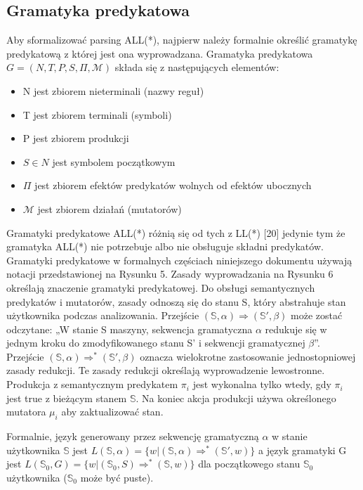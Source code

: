 \subsection{Gramatyka predykatowa}
Aby sformalizować parsing ALL(*), najpierw należy formalnie
określić gramatykę predykatową z której jest ona wyprowadzana.
Gramatyka predykatowa \(G = (N, T, P, S, \Pi, \mathcal{M})\) składa się z następujących elementów: 
\begin{itemize}
\item N jest zbiorem nieterminali (nazwy reguł)
\item T jest zbiorem terminali (symboli) 
\item P jest zbiorem produkcji 
\item \(S \in N\) jest symbolem początkowym 
\item \( \Pi \) jest zbiorem efektów predykatów wolnych od efektów ubocznych
\item \(\mathcal{M}\) jest zbiorem działań (mutatorów) 
\end{itemize}
Gramatyki predykatowe ALL(*) różnią się od tych z LL(*) [20] jedynie tym że
gramatyka ALL(*) nie potrzebuje albo nie obsługuje składni predykatów.
Gramatyki predykatowe w formalnych częściach niniejszego dokumentu używają
notacji przedstawionej na Rysunku 5.
Zasady wyprowadzania na Rysunku 6 określają znaczenie gramatyki predykatowej.
Do obsługi semantycznych predykatów i mutatorów, zasady odnoszą się do stanu S,
który abstrahuje stan użytkownika podczas analizowania.
Przejście \(( \mathbb{S}, \alpha) \Rightarrow ( \mathbb{S'}, \beta) \)
może zostać odczytane: „W stanie S maszyny, sekwencja gramatyczna \(\alpha\)
redukuje się w jednym kroku do zmodyfikowanego stanu S' i sekwencji gramatycznej \(\beta\)”.
Przejście \((\mathbb{S}, \alpha) \Rightarrow^* (\mathbb{S'}, \beta)\)
oznacza wielokrotne zastosowanie jednostopniowej zasady redukcji.
Te zasady redukcji określają wyprowadzenie lewostronne.
Produkcja z semantycznym predykatem \(\pi_i\) jest wykonalna tylko wtedy,
gdy \(\pi_i\) jest true z bieżącym stanem \(\mathbb{S}\).
Na koniec akcja produkcji używa określonego mutatora \(\mu_i\) aby zaktualizować stan.
\par
Formalnie, język generowany przez sekwencję gramatyczną \(\alpha\)
w stanie użytkownika \(\mathbb{S}\)
jest \(L(\mathbb{S},\alpha) = \{w| (\mathbb{S},\alpha)\Rightarrow^*(\mathbb{S'},w)\} \)
a język gramatyki G jest \(L(\mathbb{S}_0,G) = \{w| (\mathbb{S}_0,S)\Rightarrow^*(\mathbb{S},w)\} \)
dla początkowego stanu \(\mathbb{S}_0\) użytkownika (\(\mathbb{S}_0\) może być puste).
